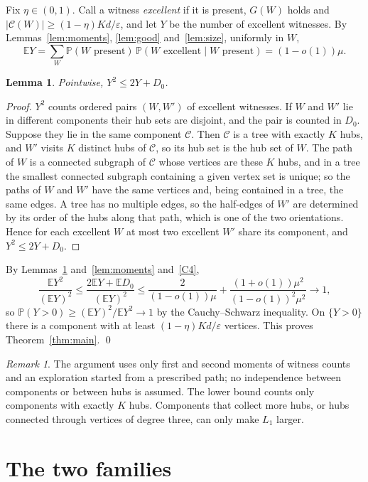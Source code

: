 \documentclass[11pt]{amsart}
\newtheorem{lemma}[theorem]{Lemma}
\theoremstyle{definition}
\theoremstyle{remark}
\newtheorem{remark}[theorem]{Remark}
\numberwithin{equation}{section}
\newcommand{\PP}{\mathbb P}
\newcommand{\E}{\mathbb E}
\newcommand{\eps}{\varepsilon}
\newcommand{\cC}{\mathcal C}
\begin{document}
Fix $\eta\in(0,1)$. Call a witness \emph{excellent} if it is present, $G(W)$ holds and $|\cC(W)|\ge(1-\eta)Kd/\eps$, and let $Y$ be the number of excellent witnesses. By Lemmas~\ref{lem:moments}, \ref{lem:good} and~\ref{lem:size}, uniformly in $W$,
\[
\E Y=\sum_W\PP(W\text{ present})\,\PP(W\text{ excellent}\mid W\text{ present})=(1-o(1))\mu .
\]

\begin{lemma}\label{lem:pairs}
Pointwise, $Y^2\le2Y+D_0$.
\end{lemma}

\begin{proof}
$Y^2$ counts ordered pairs $(W,W')$ of excellent witnesses. If $W$ and $W'$ lie in different components their hub sets are disjoint, and the pair is counted in $D_0$. Suppose they lie in the same component $\cC$. Then $\cC$ is a tree with exactly $K$ hubs, and $W'$ visits $K$ distinct hubs of $\cC$, so its hub set is the hub set of $W$. The path of $W$ is a connected subgraph of $\cC$ whose vertices are these $K$ hubs, and in a tree the smallest connected subgraph containing a given vertex set is unique; so the paths of $W$ and $W'$ have the same vertices and, being contained in a tree, the same edges. A tree has no multiple edges, so the half-edges of $W'$ are determined by its order of the hubs along that path, which is one of the two orientations. Hence for each excellent $W$ at most two excellent $W'$ share its component, and $Y^2\le2Y+D_0$.
\end{proof}

By Lemmas~\ref{lem:pairs} and~\ref{lem:moments} and~\ref{C4},
\[
\frac{\E Y^2}{(\E Y)^2}\le\frac{2\E Y+\E D_0}{(\E Y)^2}\le\frac{2}{(1-o(1))\mu}+\frac{(1+o(1))\mu^2}{(1-o(1))^2\mu^2}\to1,
\]
so $\PP(Y>0)\ge(\E Y)^2/\E Y^2\to1$ by the Cauchy--Schwarz inequality. On $\{Y>0\}$ there is a component with at least $(1-\eta)Kd/\eps$ vertices. This proves Theorem~\ref{thm:main}. \qed

\begin{remark}
The argument uses only first and second moments of witness counts and an exploration started from a prescribed path; no independence between components or between hubs is assumed. The lower bound counts only components with exactly $K$ hubs. Components that collect more hubs, or hubs connected through vertices of degree three, can only make $L_1$ larger.
\end{remark}

\section{The two families}
\end{document}
